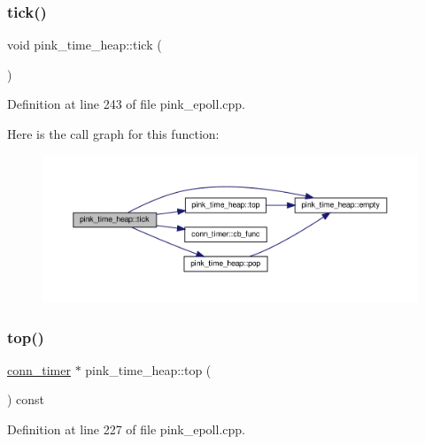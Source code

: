\subsubsection{\texorpdfstring{tick()}{tick()}}
{\footnotesize\ttfamily void pink\+\_\+time\+\_\+heap\+::tick (\begin{DoxyParamCaption}{ }\end{DoxyParamCaption})}



Definition at line 243 of file pink\+\_\+epoll.\+cpp.

Here is the call graph for this function\+:
\nopagebreak
\begin{figure}[H]
\begin{center}
\leavevmode
\includegraphics[width=350pt]{classpink__time__heap_a9193dc948c6bb00005bf6639f2169b57_cgraph}
\end{center}
\end{figure}
\mbox{\label{classpink__time__heap_ac0932b13390241373290a321ecf16600}} 
\subsubsection{\texorpdfstring{top()}{top()}}
{\footnotesize\ttfamily \hyperlink{classconn__timer}{conn\+\_\+timer} $\ast$ pink\+\_\+time\+\_\+heap\+::top (\begin{DoxyParamCaption}{ }\end{DoxyParamCaption}) const}



Definition at line 227 of file pink\+\_\+epoll.\+cpp.

